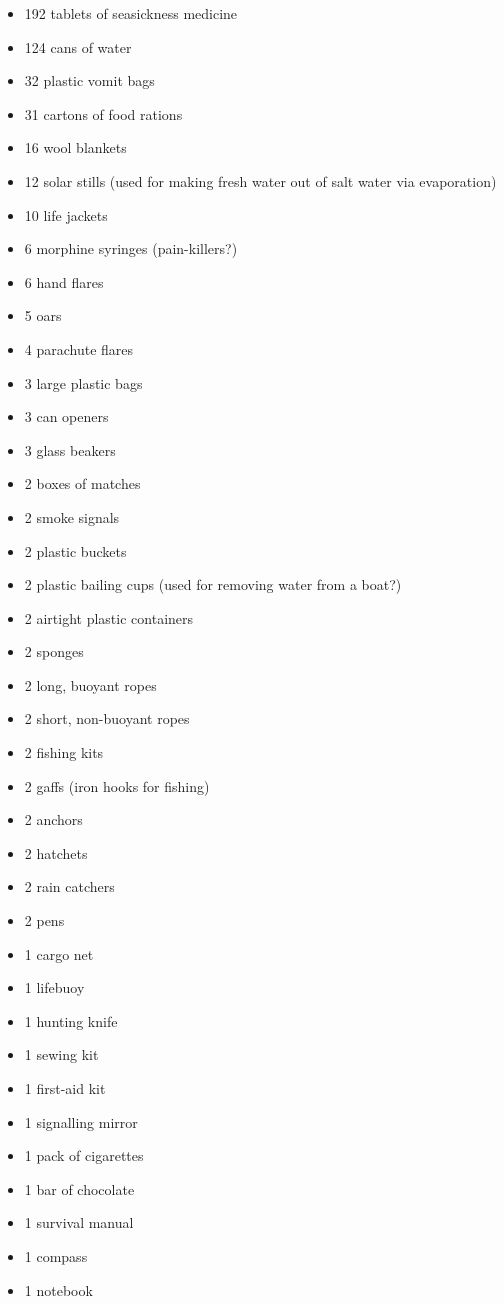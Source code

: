 \documentclass[11pt]{article}
\begin{document}
\begin{itemize}
\item 192 tablets of seasickness medicine
\item 124 cans of water
\item 32 plastic vomit bags
\item 31 cartons of food rations
\item 16 wool blankets
\item 12 solar stills (used for making fresh water out of salt water via evaporation)
\item 10 life jackets
\item 6 morphine syringes (pain-killers?)
\item 6 hand flares
\item 5 oars
\item 4 parachute flares
\item 3 large plastic bags
\item 3 can openers
\item 3 glass beakers
\item 2 boxes of matches
\item 2 smoke signals
\item 2 plastic buckets
\item 2 plastic bailing cups (used for removing water from a boat?)
\item 2 airtight plastic containers
\item 2 sponges
\item 2 long, buoyant ropes
\item 2 short, non-buoyant ropes
\item 2 fishing kits
\item 2 gaffs (iron hooks for fishing)
\item 2 anchors
\item 2 hatchets
\item 2 rain catchers
\item 2 pens
\item 1 cargo net
\item 1 lifebuoy
\item 1 hunting knife
\item 1 sewing kit
\item 1 first-aid kit
\item 1 signalling mirror
\item 1 pack of cigarettes
\item 1 bar of chocolate
\item 1 survival manual
\item 1 compass
\item 1 notebook
\end{itemize}
\end{document}

